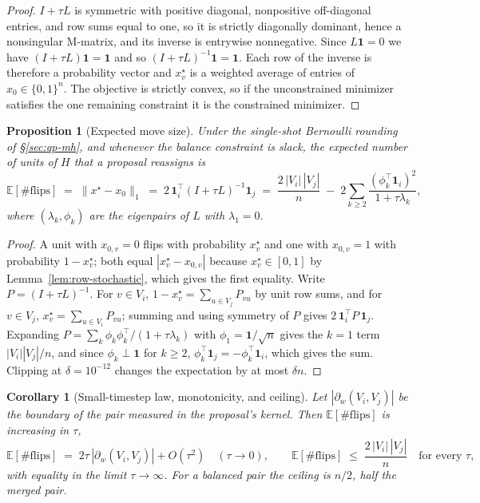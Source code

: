 \documentclass[11pt]{article}
\newtheorem{proposition}{Proposition}[section]
\newtheorem{corollary}{Corollary}[section]
\newcommand{\E}{\mathbb{E}}
\begin{document}
\begin{proof}
$I + \tau L$ is symmetric with positive diagonal, nonpositive
off-diagonal entries, and row sums equal to one, so it is strictly
diagonally dominant, hence a nonsingular M-matrix, and its inverse is
entrywise nonnegative. Since $L\mathbf{1} = 0$ we have
$(I + \tau L)\mathbf{1} = \mathbf{1}$ and so
$(I + \tau L)^{-1}\mathbf{1} = \mathbf{1}$. Each row of the inverse is
therefore a probability vector and $x^\star_v$ is a weighted average of
entries of $x_0 \in \{0,1\}^n$. The objective is strictly convex, so if
the unconstrained minimizer satisfies the one remaining constraint it
is the constrained minimizer.
\end{proof}

\begin{proposition}[Expected move size]\label{prop:move-size}
Under the single-shot Bernoulli rounding of \S\ref{sec:qp-mh}, and
whenever the balance constraint is slack, the expected number of units
of $H$ that a proposal reassigns is
\begin{equation}\label{eq:move-size}
  \E[\#\mathrm{flips}]
  \;=\; \|x^\star - x_0\|_1
  \;=\; 2\,\mathbf{1}_i^{\top}(I + \tau L)^{-1}\mathbf{1}_j
  \;=\; \frac{2\,|V_i|\,|V_j|}{n}
        \;-\; 2\sum_{k \ge 2}\frac{(\phi_k^{\top}\mathbf{1}_i)^2}{1 + \tau\lambda_k},
\end{equation}
where $(\lambda_k, \phi_k)$ are the eigenpairs of $L$ with
$\lambda_1 = 0$.
\end{proposition}

\begin{proof}
A unit with $x_{0,v} = 0$ flips with probability $x^\star_v$ and one
with $x_{0,v} = 1$ with probability $1 - x^\star_v$; both equal
$|x^\star_v - x_{0,v}|$ because $x^\star_v \in [0,1]$ by
Lemma~\ref{lem:row-stochastic}, which gives the first equality.
Write $P = (I + \tau L)^{-1}$. For $v \in V_i$,
$1 - x^\star_v = \sum_{u \in V_j} P_{vu}$ by unit row sums, and for
$v \in V_j$, $x^\star_v = \sum_{u \in V_i} P_{vu}$; summing and using
symmetry of $P$ gives $2\,\mathbf{1}_i^{\top} P\, \mathbf{1}_j$.
Expanding $P = \sum_k \phi_k\phi_k^{\top}/(1 + \tau\lambda_k)$ with
$\phi_1 = \mathbf{1}/\sqrt{n}$ gives the $k = 1$ term
$|V_i||V_j|/n$, and since $\phi_k \perp \mathbf{1}$ for $k \ge 2$,
$\phi_k^{\top}\mathbf{1}_j = -\phi_k^{\top}\mathbf{1}_i$, which
gives the sum. Clipping at $\delta = 10^{-12}$ changes the expectation
by at most $\delta n$.
\end{proof}

\begin{corollary}[Small-timestep law, monotonicity, and ceiling]\label{cor:small-tau}
Let $|\partial_w(V_i, V_j)|$ be the boundary of the pair measured in
the proposal's kernel. Then $\E[\#\mathrm{flips}]$ is increasing in
$\tau$,
\[
  \E[\#\mathrm{flips}] \;=\; 2\tau\,|\partial_w(V_i,V_j)| + O(\tau^2)
  \quad (\tau \to 0),
  \qquad
  \E[\#\mathrm{flips}] \;\le\; \frac{2\,|V_i|\,|V_j|}{n}
  \quad\text{for every } \tau,
\]
with equality in the limit $\tau \to \infty$. For a balanced pair the
ceiling is $n/2$, half the merged pair.
\end{corollary}
\end{document}
